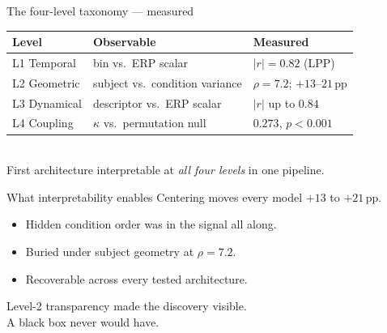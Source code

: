 \documentclass[11pt,aspectratio=169]{beamer}
\begin{document}
\begin{frame}{The four-level taxonomy --- measured}
  \centering\small
  \vspace{0.4em}
  \begin{tabular}{lll}\toprule
    \textbf{Level} & \textbf{Observable} & \textbf{Measured} \\\midrule
    L1 Temporal     & bin vs.\ ERP scalar            & $|r| = 0.82$ (LPP) \\
    L2 Geometric    & subject vs.\ condition variance & $\rho = 7.2$; $+13$--$21$\,pp \\
    L3 Dynamical    & descriptor vs.\ ERP scalar      & $|r|$ up to $0.84$ \\
    L4 Coupling     & $\kappa$ vs.\ permutation null  & $0.273$, $p<0.001$ \\
    \bottomrule
  \end{tabular}
  \vspace{0.6em}\\
  \normalsize\color{sbnavy}
  First architecture interpretable at \emph{all four levels} in one pipeline.
\end{frame}

\begin{frame}{What interpretability enables}
  \vspace{0.6em}
  Centering moves \alert{every} model $+13$ to $+21$\,pp.
  \vspace{0.6em}
  \begin{itemize}
    \item Hidden condition order was in the signal all along.
    \item Buried under subject geometry at $\rho=7.2$.
    \item Recoverable across every tested architecture.
  \end{itemize}
  \vspace{0.6em}
  \begin{center}\color{sbnavy}
    Level-2 transparency made the discovery visible.\\
    A black box never would have.
  \end{center}
\end{frame}
\end{document}
